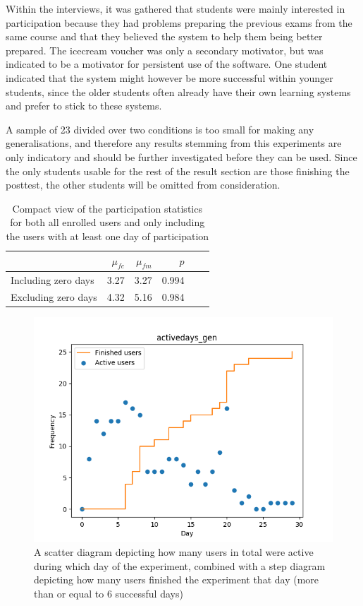 Within the interviews, it was gathered that students were mainly interested in participation because they had problems preparing the previous exams from the same course and that they believed the system to help them being better prepared. The icecream voucher was only a secondary motivator, but was indicated to be a motivator for persistent use of the software. One student indicated that the system might however be more successful within younger students, since the older students often already have their own learning systems and prefer to stick to these systems.

A sample of 23 divided over two conditions is too small for making any generalisations, and therefore any results stemming from this experiments are only indicatory and should be further investigated before they can be used. Since the only students usable for the rest of the result section are those finishing the posttest, the other students will be omitted from consideration.

\begin{table}
    \centering
    \begin{tabular}{lrrrrr}
        \toprule
        & $\mu_{fc}$ & $\mu_{fm}$ & $p$ \\
        \midrule
        Including zero days & 3.27 & 3.27 & 0.994 \\
        Excluding zero days & 4.32 & 5.16 & 0.984 \\
        \bottomrule
    \end{tabular}
    \caption{Compact view of the participation statistics for both all enrolled users and only including the users with at least one day of participation}
    \label{tab:participation}
\end{table}

\begin{figure}
    \centering
    \includegraphics[width=.7\textwidth]{img/activedays_gen.png}
    \caption{A scatter diagram depicting how many users in total were active during which day of the experiment, combined with a step diagram depicting how many users finished the experiment that day (more than or equal to 6 successful days)}
    \label{fig:activedays_gen}
\end{figure}


